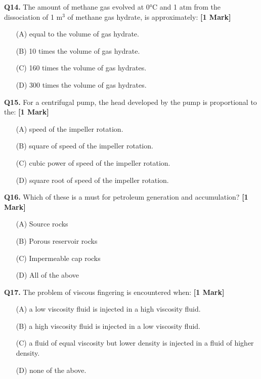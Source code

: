 \documentclass[11pt]{article}
\newcommand{\questiona}[2]{
    \noindent\textbf{Q#2.} #1 \hfill \textbf{[1 Mark]}
}
\begin{document}
\questiona{The amount of methane gas evolved at 0°C and 1 atm from the dissociation of 1 m\(^3\) of methane gas hydrate, is approximately:}{14}
\begin{enumerate}
    \item[(A)] equal to the volume of gas hydrate.  
    \item[(B)] 10 times the volume of gas hydrate.  
    \item[(C)] 160 times the volume of gas hydrates.  
    \item[(D)] 300 times the volume of gas hydrates.  
\end{enumerate}
\vspace{0.5cm}

\questiona{For a centrifugal pump, the head developed by the pump is proportional to the:}{15}
\begin{enumerate}
    \item[(A)] speed of the impeller rotation.  
    \item[(B)] square of speed of the impeller rotation.  
    \item[(C)] cubic power of speed of the impeller rotation.  
    \item[(D)] square root of speed of the impeller rotation.  
\end{enumerate}
\vspace{0.5cm}

\questiona{Which of these is a must for petroleum generation and accumulation?}{16}
\begin{enumerate}
    \item[(A)] Source rocks  
    \item[(B)] Porous reservoir rocks  
    \item[(C)] Impermeable cap rocks  
    \item[(D)] All of the above  
\end{enumerate}
\vspace{0.5cm}

\questiona{The problem of viscous fingering is encountered when:}{17}
\begin{enumerate}
    \item[(A)] a low viscosity fluid is injected in a high viscosity fluid.  
    \item[(B)] a high viscosity fluid is injected in a low viscosity fluid.  
    \item[(C)] a fluid of equal viscosity but lower density is injected in a fluid of higher density.  
    \item[(D)] none of the above.  
\end{enumerate}
\vspace{0.5cm}
\end{document}
